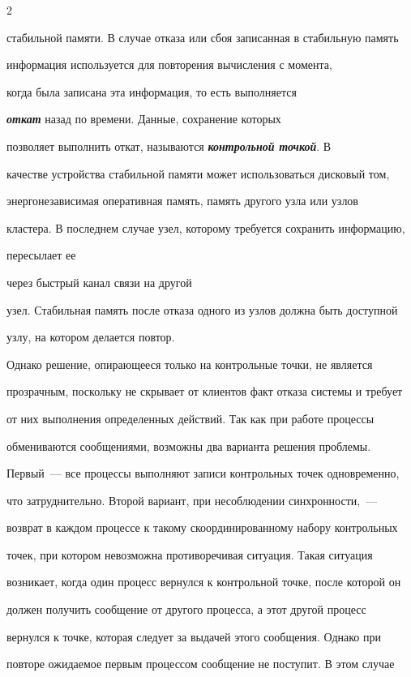 \begin{multicols}{2}
{{{стабильной памяти}}.  В случае отказа или сбоя записанная в стабильную память 

информация используется для повторения вы\-чис\-ле\-ния с момента,\linebreak 

когда была записана эта информация, то есть выполняется 

{\bfseries\textit{откат}} назад по времени. Данные, сохранение которых 

позволяет выполнить откат, называются {\bfseries\textit{контрольной точкой}}. В 

качестве устройства стабильной памяти может использоваться дисковый том, 

энергонезависимая оперативная память, память другого узла или узлов 

клас\-те\-ра. В последнем случае узел, которому требуется сохранить информацию, 

пересылает ее

 через быстрый канал связи на другой

узел. Стабильная память после отказа одного из узлов должна быть доступной

узлу, на котором делается повтор.



Однако решение, опирающееся только на контрольные точки, не является

прозрачным, поскольку не скрывает от клиентов факт отказа сис\-те\-мы и требует

от них выполнения определенных действий. Так как при работе процессы

обмениваются сообщениями, возможны два варианта решения проблемы.

Первый~--- все процессы выполняют записи контрольных точек одновременно,

что затруднительно. Второй вариант, при несоблюдении синхронности,~---

возврат в каждом процессе к такому скоординированному набору контрольных

точек, при котором невозможна противоречивая ситуация. Такая ситуация

возникает, когда один процесс вернулся к контрольной точке, после которой он

должен получить сообщение от другого процесса, а этот другой процесс

вернулся к точке, которая следует за выдачей этого сообщения. Однако при

повторе ожидаемое первым процессом сообщение не поступит. В этом случае

}
\end{multicols}
